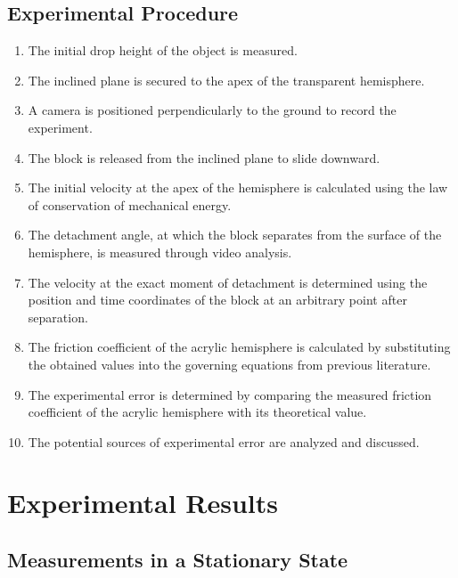 \documentclass[11pt,letterpaper]{article}
\begin{document}
\subsection{Experimental Procedure}
\begin{enumerate}
    \item The initial drop height of the object is measured.

    \item The inclined plane is secured to the apex of the transparent hemisphere.

    \item A camera is positioned perpendicularly to the ground to record the experiment.

    \item The block is released from the inclined plane to slide downward.

    \item The initial velocity at the apex of the hemisphere is calculated using the law of conservation of mechanical energy.

    \item The detachment angle, at which the block separates from the surface of the hemisphere, is measured through video analysis.

    \item The velocity at the exact moment of detachment is determined using the position and time coordinates of the block at an arbitrary point after separation.

    \item The friction coefficient of the acrylic hemisphere is calculated by substituting the obtained values into the governing equations from previous literature.

    \item The experimental error is determined by comparing the measured friction coefficient of the acrylic hemisphere with its theoretical value.

    \item The potential sources of experimental error are analyzed and discussed.
\end{enumerate}

\section{Experimental Results}

\subsection{Measurements in a Stationary State}
\end{document}
